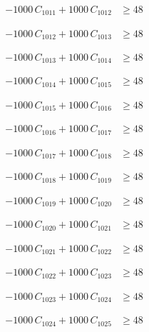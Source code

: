 \documentclass[a4paper,11pt]{article}
\begin{document}
\begin{align}
-1000\,C_{1011} + 1000\,C_{1012} &\geq 48 \nonumber
\end{align}

\begin{align}
-1000\,C_{1012} + 1000\,C_{1013} &\geq 48 \nonumber
\end{align}

\begin{align}
-1000\,C_{1013} + 1000\,C_{1014} &\geq 48 \nonumber
\end{align}

\begin{align}
-1000\,C_{1014} + 1000\,C_{1015} &\geq 48 \nonumber
\end{align}

\begin{align}
-1000\,C_{1015} + 1000\,C_{1016} &\geq 48 \nonumber
\end{align}

\begin{align}
-1000\,C_{1016} + 1000\,C_{1017} &\geq 48 \nonumber
\end{align}

\begin{align}
-1000\,C_{1017} + 1000\,C_{1018} &\geq 48 \nonumber
\end{align}

\begin{align}
-1000\,C_{1018} + 1000\,C_{1019} &\geq 48 \nonumber
\end{align}

\begin{align}
-1000\,C_{1019} + 1000\,C_{1020} &\geq 48 \nonumber
\end{align}

\begin{align}
-1000\,C_{1020} + 1000\,C_{1021} &\geq 48 \nonumber
\end{align}

\begin{align}
-1000\,C_{1021} + 1000\,C_{1022} &\geq 48 \nonumber
\end{align}

\begin{align}
-1000\,C_{1022} + 1000\,C_{1023} &\geq 48 \nonumber
\end{align}

\begin{align}
-1000\,C_{1023} + 1000\,C_{1024} &\geq 48 \nonumber
\end{align}

\begin{align}
-1000\,C_{1024} + 1000\,C_{1025} &\geq 48 \nonumber
\end{align}
\end{document}
